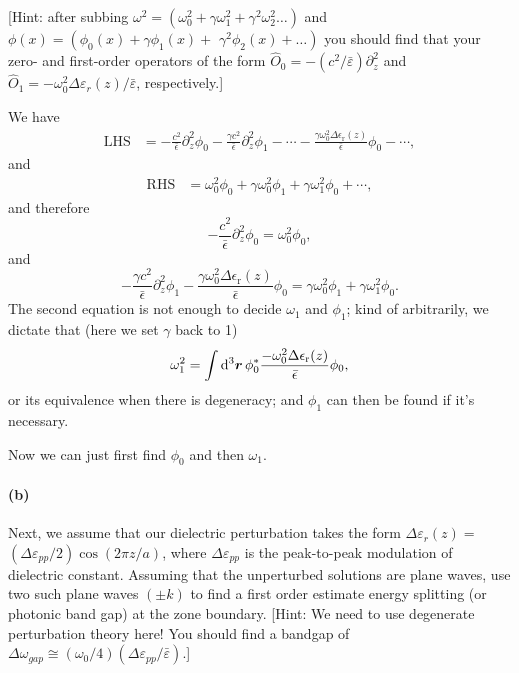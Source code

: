 \documentclass[hyperref, a4paper]{article}
\newcommand{\epsr}{\epsilon_{\text{r}}}
\begin{document}
[Hint: after subbing $\omega^2=\left(\omega_0^2+\gamma \omega_1^2+\gamma^2 \omega_2^2 \ldots\right)$ and $\phi(x)=\left(\phi_0(x)+\gamma \phi_1(x)+\right.$ $\left.\gamma^2 \phi_2(x)+\ldots\right)$ you should find that your zero- and first-order operators of the form $\hat{O}_0=-\left(c^2 / \bar{\varepsilon}\right) \partial_z^2$ and $\hat{O}_1=-\omega_0^2 \Delta \varepsilon_r(z) / \bar{\varepsilon}$, respectively.]

We have 
\[
    \begin{aligned}
        \text{LHS} &= - \frac{c^2}{\bar{\epsilon}} \partial_z^2 \phi_0 
        - \frac{\gamma c^2}{\bar{\epsilon}} \partial_z^2 \phi_1 - \cdots 
        - \frac{\gamma \omega_0^2 \Delta \epsr(z)}{\bar{\epsilon}} \phi_0 - \cdots ,
    \end{aligned}
\]
and 
\[
    \begin{aligned}
        \text{RHS} &= \omega_0^2 \phi_0 + \gamma \omega_0^2 \phi_1 + \gamma \omega_1^2 \phi_0 + \cdots,
    \end{aligned}
\]
and therefore 
\begin{equation}
    - \frac{c^2}{\bar{\epsilon}} \partial_z^2 \phi_0 = \omega_0^2 \phi_0,
\end{equation}
and 
\begin{equation}
    - \frac{\gamma c^2}{\bar{\epsilon}} \partial_z^2 \phi_1
    - \frac{\gamma \omega_0^2 \Delta \epsr(z)}{\bar{\epsilon}} \phi_0
    = \gamma \omega_0^2 \phi_1 + \gamma \omega_1^2 \phi_0.
\end{equation}
The second equation is not enough to decide $\omega_1$ and $\phi_1$;
kind of arbitrarily, we dictate that (here we set $\gamma$ back to 1)
\begin{equation}
    \omega_1^2 = \int \dd[3]{\vb*{r}} \phi_0^* \frac{- \omega_0^2 \Delta \epsr(z)}{\bar{\epsilon}} \phi_0 ,
\end{equation}
or its equivalence when there is degeneracy; and $\phi_1$ can then be found if it's necessary.

Now we can just first find $\phi_0$ and then $\omega_1$.

\paragraph*{(b)} Next, we assume that our dielectric perturbation takes the form $\Delta \varepsilon_r(z)=$ $\left(\Delta \varepsilon_{p p} / 2\right) \cos (2 \pi z / a)$, where $\Delta \varepsilon_{p p}$ is the peak-to-peak modulation of dielectric constant. Assuming that the unperturbed solutions are plane waves, use two such plane waves $( \pm k)$ to find a first order estimate energy splitting (or photonic band gap) at the zone boundary.
[Hint: We need to use degenerate perturbation theory here! You should find a bandgap of $\Delta \omega_{g a p} \cong\left(\omega_0 / 4\right)\left(\Delta \varepsilon_{p p} / \bar{\varepsilon}\right)$.]
\end{document}
